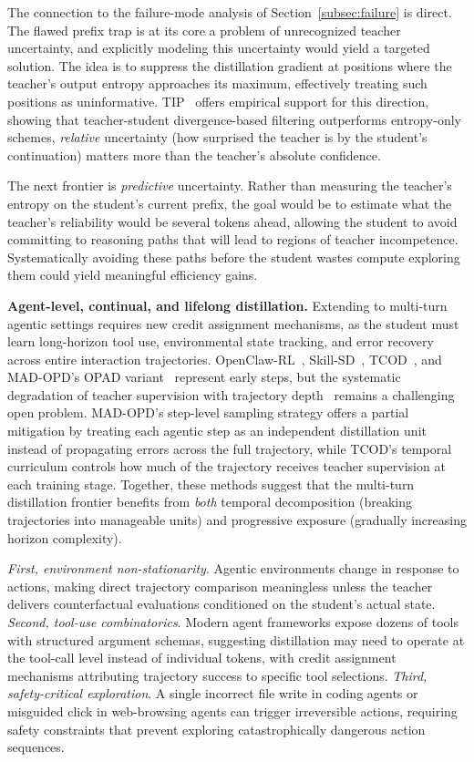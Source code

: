 \documentclass{article} %
\begin{document}
The connection to the failure-mode analysis of Section~\ref{subsec:failure} is direct. The flawed prefix trap is at its core a problem of unrecognized teacher uncertainty, and explicitly modeling this uncertainty would yield a targeted solution. The idea is to suppress the distillation gradient at positions where the teacher's output entropy approaches its maximum, effectively treating such positions as uninformative. TIP~\citep{2604.14084} offers empirical support for this direction, showing that teacher-student divergence-based filtering outperforms entropy-only schemes, \emph{relative} uncertainty (how surprised the teacher is by the student's continuation) matters more than the teacher's absolute confidence.

The next frontier is \emph{predictive} uncertainty. Rather than measuring the teacher's entropy on the student's current prefix, the goal would be to estimate what the teacher's reliability would be several tokens ahead, allowing the student to avoid committing to reasoning paths that will lead to regions of teacher incompetence. Systematically avoiding these paths before the student wastes compute exploring them could yield meaningful efficiency gains.

\textbf{Agent-level, continual, and lifelong distillation.} Extending to multi-turn agentic settings requires new credit assignment mechanisms, as the student must learn long-horizon tool use, environmental state tracking, and error recovery across entire interaction trajectories. OpenClaw-RL~\citep{2603.10165}, Skill-SD~\citep{2604.10674}, TCOD~\citep{2604.24005}, and MAD-OPD's OPAD variant~\citep{2605.01347} represent early steps, but the systematic degradation of teacher supervision with trajectory depth~\citep{2604.13016} remains a challenging open problem. MAD-OPD's step-level sampling strategy offers a partial mitigation by treating each agentic step as an independent distillation unit instead of propagating errors across the full trajectory, while TCOD's temporal curriculum controls how much of the trajectory receives teacher supervision at each training stage. Together, these methods suggest that the multi-turn distillation frontier benefits from \emph{both} temporal decomposition (breaking trajectories into manageable units) and progressive exposure (gradually increasing horizon complexity).

\emph{First, environment non-stationarity}. Agentic environments change in response to actions, making direct trajectory comparison meaningless unless the teacher delivers counterfactual evaluations conditioned on the student's actual state. \emph{Second, tool-use combinatorics}. Modern agent frameworks expose dozens of tools with structured argument schemas, suggesting distillation may need to operate at the tool-call level instead of individual tokens, with credit assignment mechanisms attributing trajectory success to specific tool selections. \emph{Third, safety-critical exploration}. A single incorrect file write in coding agents or misguided click in web-browsing agents can trigger irreversible actions, requiring safety constraints that prevent exploring catastrophically dangerous action sequences.
\end{document}
